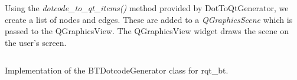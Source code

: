 \documentclass[\rootfolder/main.tex]{subfiles}
\begin{document}
Using the \emph{dotcode\_to\_qt\_items()} method provided by DotToQtGenerator, we create a list of nodes and edges.
These are added to a \emph{QGraphicsScene} which is passed to the QGraphicsView.
The QGraphicsView widget draws the scene on the user's screen.

\begin{listing}
    \inputminted{python}{\rootfolder/Chapters/Chapter4/Listings/dotcode.py}
    \caption{Implementation of the BTDotcodeGenerator class for rqt\_bt.}
    \label{lst:btdotcode}
\end{listing}
\end{document}
